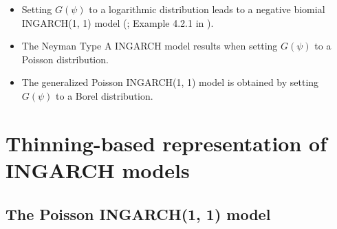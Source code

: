 \documentclass{article}
\begin{document}
\begin{itemize}
\item Setting $G(\psi)$ to a logarithmic distribution %
leads to a negative biomial INGARCH(1, 1) model (\cite{Xu2012}; Example 4.2.1 in \cite{Weiss2018}). %
\item The Neyman Type A INGARCH model \cite{Goncalves2015a} results when setting $G(\psi)$ to a Poisson distribution. %
\item The generalized Poisson INGARCH(1, 1) model \cite{Zhu2012} is obtained by setting $G(\psi)$ to a Borel distribution. %
\end{itemize}

\section{Thinning-based representation of INGARCH models}%
\label{sec:alternative_formulation}

\subsection{The Poisson INGARCH(1, 1) model}
\label{subsec:poisson11}
\end{document}
